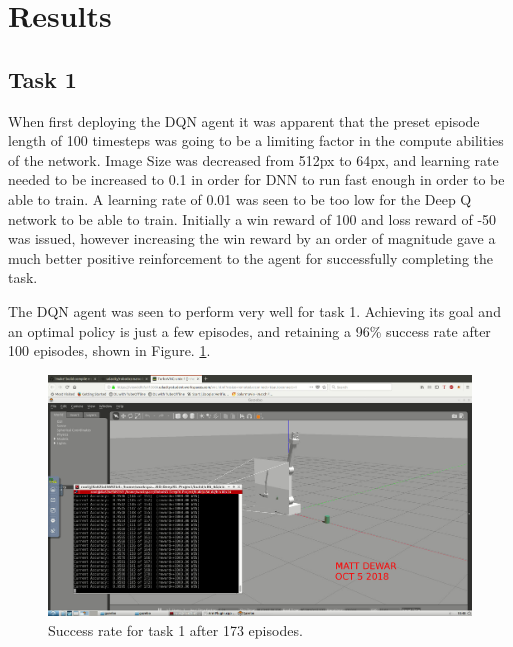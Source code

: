 \documentclass[1p, number, sort&compress,table, 11pt]{elsarticle}
\begin{document}
	\section{Results}\label{sec:results}

	\subsection{Task 1}\label{subsec:task1}

	When first deploying the DQN agent it was apparent that the preset episode length of 100 timesteps was going to be a limiting factor in the compute abilities of the network. Image Size was decreased from 512px to 64px, and learning rate needed to be increased to 0.1 in order for DNN to run fast enough in order to be able to train. A learning rate of 0.01 was seen to be too low for the Deep Q network to be able to train. Initially a win reward of 100 and loss reward of -50 was issued, however increasing the win reward by an order of magnitude gave a much better positive reinforcement to the agent for successfully completing the task. 

	The DQN agent was seen to perform very well for task 1. Achieving its goal and an optimal policy is just a few episodes, and retaining a 96\% success rate after 100 episodes, shown in Figure. \ref{fig:task1}.
	
	\begin{figure}[thpb]
		\centering
		\includegraphics[width=\linewidth]{../images/Deep_RL-task1.jpg}
		\caption{Success rate for task 1 after 173 episodes.}
		\label{fig:task1}
	\end{figure}
	
\end{document}
